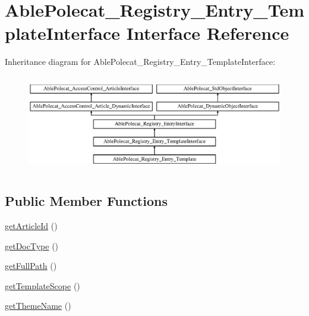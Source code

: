 \hypertarget{interface_able_polecat___registry___entry___template_interface}{}\section{Able\+Polecat\+\_\+\+Registry\+\_\+\+Entry\+\_\+\+Template\+Interface Interface Reference}
\label{interface_able_polecat___registry___entry___template_interface}
Inheritance diagram for Able\+Polecat\+\_\+\+Registry\+\_\+\+Entry\+\_\+\+Template\+Interface\+:\begin{figure}[H]
\begin{center}
\leavevmode
\includegraphics[height=4.268293cm]{interface_able_polecat___registry___entry___template_interface}
\end{center}
\end{figure}
\subsection*{Public Member Functions}
\begin{DoxyCompactItemize}
\item 
\hyperlink{interface_able_polecat___registry___entry___template_interface_a169d60493254e284dc1c60ffe9253ed4}{get\+Article\+Id} ()
\item 
\hyperlink{interface_able_polecat___registry___entry___template_interface_a039f3de296e2836b8e47ed4382baa473}{get\+Doc\+Type} ()
\item 
\hyperlink{interface_able_polecat___registry___entry___template_interface_ac151a54c6136d7dee6bbe8d0e744bd32}{get\+Full\+Path} ()
\item 
\hyperlink{interface_able_polecat___registry___entry___template_interface_a1107269713ebd12a0dc5bcd12a16f8f0}{get\+Template\+Scope} ()
\item 
\hyperlink{interface_able_polecat___registry___entry___template_interface_aa146c4c73f2e0eabc0630e1a4464a774}{get\+Theme\+Name} ()
\end{DoxyCompactItemize}
